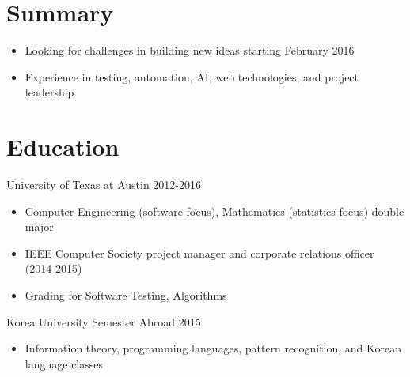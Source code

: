 \documentclass[line,margin]{res}
\begin{document}
    \address{\href{mailto:jdong42@gmail.com}{jdong42@gmail.com}}

\begin{resume}

\vspace{-8pt}
\section{Summary}
    \vspace{22pt}
        \begin{itemize} \itemsep -2pt
        \item Looking for challenges in building new ideas starting February 2016
        \item Experience in testing, automation, AI, web technologies, and project leadership 
        \end{itemize}

   
\vspace{-8pt}
\section{Education} 
    \vspace{12pt}
    University of Texas at Austin \hfill 2012-2016 \\
    \vspace{-12pt}
        \begin{itemize} \itemsep -2pt
        \item Computer Engineering (software focus), Mathematics (statistics focus) double major
        \item IEEE Computer Society project manager and corporate relations officer (2014-2015)
        \item Grading for Software Testing, Algorithms
        \end{itemize}
     
    \vspace{-8pt}
    Korea University Semester Abroad \hfill 2015 \\
    \vspace{-12pt}
        \begin{itemize} \itemsep -2pt
        \item Information theory, programming languages, pattern recognition, and Korean language classes
        \end{itemize}
  

\vspace{-8pt}

\end{resume}
\end{document}
